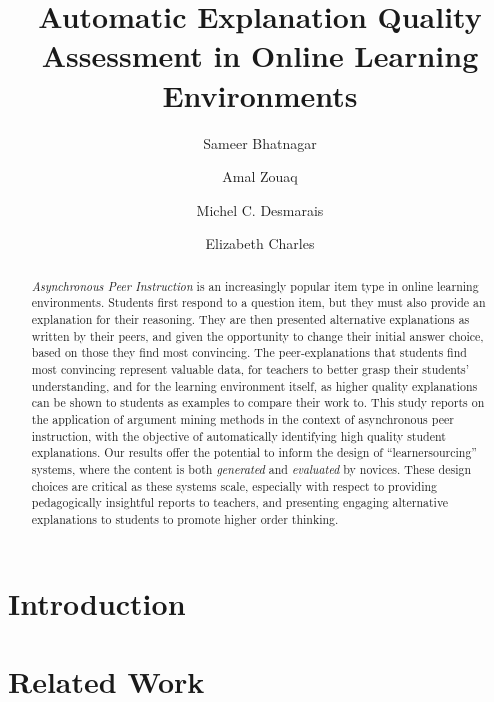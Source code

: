 \documentclass[runningheads]{llncs}
\begin{document}
%
\title{Automatic Explanation Quality Assessment in Online Learning Environments}
%
\author{Sameer Bhatnagar \and
Amal Zouaq \and
Michel C. Desmarais \and
Elizabeth Charles
}
%

%
\maketitle              %
%
\begin{abstract}
\textit{Asynchronous Peer Instruction} is an increasingly popular item type in 
online learning environments. Students first respond to a question item, but 
they must also provide an explanation for their reasoning. 
They are then presented alternative explanations as written by their peers, and 
given the opportunity to change their initial answer choice, based on those 
they find most convincing. 
The peer-explanations that students find most convincing represent valuable 
data, for teachers to better grasp their students' understanding, and for the 
learning environment itself, as higher quality explanations can be shown to 
students as examples to compare their work to. 
This study reports on the application of argument mining methods in the 
context of asynchronous peer instruction, with the objective of automatically 
identifying high quality student explanations. 
Our results offer the potential to inform the design of ``learnersourcing'' 
systems, where the content is both \textit{generated} and \textit{evaluated} by 
novices. 
These design choices are critical as these systems scale, especially with 
respect to providing pedagogically insightful reports to teachers, and 
presenting engaging alternative explanations to students to promote higher 
order thinking. 

\end{abstract}


\section{Introduction}


\section{Related Work}
\end{document}
